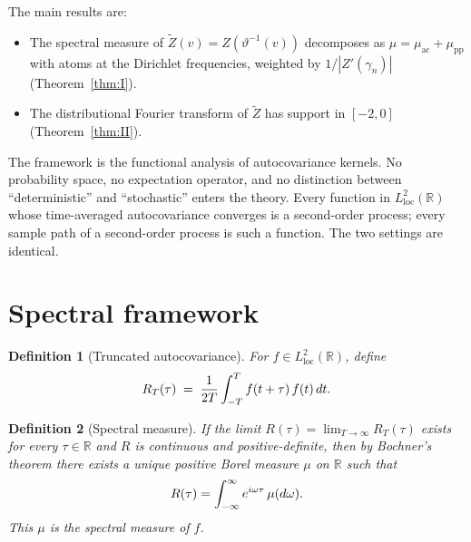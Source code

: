 \documentclass{article}
\newcommand{\tmem}[1]{{\em #1\/}}
\newtheorem{definition}{Definition}
\begin{document}
The main results are:
\begin{itemize}
  \item[(I)] The spectral measure of $\tilde{Z} (v) = Z (\vartheta^{- 1} (v))$
  decomposes as $\mu = \mu_{\mathrm{ac}} + \mu_{\mathrm{pp}}$ with atoms at
  the Dirichlet frequencies, weighted by $1 / |Z' (\gamma_n) |$
  (Theorem~\ref{thm:I}).
  
  \item[(II)] The distributional Fourier transform of $\tilde{Z}$ has support
  in $[- 2, 0]$ (Theorem~\ref{thm:II}).
\end{itemize}
The framework is the functional analysis of autocovariance kernels. No
probability space, no expectation operator, and no distinction between
``deterministic'' and ``stochastic'' enters the theory. Every function in
$L^2_{\mathrm{loc}} (\mathbb{R})$ whose time-averaged autocovariance converges
is a second-order process; every sample path of a second-order process is such
a function. The two settings are identical.

\section{Spectral framework}\label{sec:framework}

\begin{definition}
  [Truncated autocovariance]\label{def:autocov} For $f \in L^2_{\mathrm{loc}}
  (\mathbb{R})$, define
  \[ R_T (\tau) \hspace{0.27em} = \hspace{0.27em} \frac{1}{2 T}  \int_{- T}^T
     f (t + \tau)  \hspace{0.17em} f (t)  \hspace{0.17em} dt. \]
\end{definition}

\begin{definition}
  [Spectral measure]\label{def:spectral-bochner} If the limit $R (\tau) =
  \lim_{T \to \infty} R_T (\tau)$ exists for every $\tau \in \mathbb{R}$ and
  $R$ is continuous and positive-definite, then by Bochner's theorem there
  exists a unique positive Borel measure $\mu$ on $\mathbb{R}$ such that
  \begin{equation}
    \label{eq:bochner} R (\tau) = \int_{- \infty}^{\infty} e^{i \omega \tau} 
    \hspace{0.17em} \mu (d \omega) .
  \end{equation}
  This $\mu$ is the {\tmem{spectral measure}} of $f$.
\end{definition}
\end{document}
